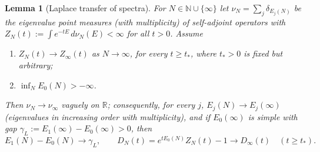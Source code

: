 \documentclass[11pt,a4paper]{article}
\theoremstyle{plain}
\newtheorem{lemma}[theorem]{Lemma}
\theoremstyle{definition}
\newcommand{\R}{\mathbb{R}}
\begin{document}
\begin{lemma}[Laplace transfer of spectra]\label{lem:laplace}
For $N\in\mathbb N\cup\{\infty\}$ let $\nu_N=\sum_j\delta_{E_j(N)}$ be the eigenvalue
point measures (with multiplicity) of self-adjoint operators with
$Z_N(t):=\int e^{-tE}\,d\nu_N(E)<\infty$ for all $t>0$. Assume
\begin{enumerate}
\item[\rm(i)] $Z_N(t)\to Z_\infty(t)$ as $N\to\infty$, for every $t\ge t_*$, where
$t_*>0$ is fixed but arbitrary;
\item[\rm(ii)] $\inf_NE_0(N)>-\infty$.
\end{enumerate}
Then $\nu_N\to\nu_\infty$ vaguely on $\R$; consequently, for every $j$,
$E_j(N)\to E_j(\infty)$ (eigenvalues in increasing order with multiplicity), and if
$E_0(\infty)$ is simple with gap $\gamma_L:=E_1(\infty)-E_0(\infty)>0$, then
\[
 E_1(N)-E_0(N)\longrightarrow\gamma_L,
 \qquad
 D_N(t)=e^{tE_0(N)}Z_N(t)-1\longrightarrow D_\infty(t)\quad(t\ge t_*).
\]
\end{lemma}
\end{document}
